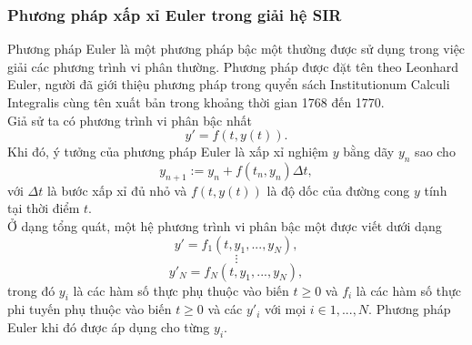 \documentclass[a4paper]{article}
\begin{document}
\subsubsection{Phương pháp xấp xỉ Euler trong giải hệ SIR}
Phương pháp Euler là một phương pháp bậc một thường được sử dụng trong việc giải các phương trình vi phân thường. Phương pháp được đặt tên theo Leonhard Euler, người đã giới thiệu phương pháp trong quyển sách Institutionum Calculi Integralis cùng tên xuất bản trong khoảng thời gian 1768 đến 1770.
\\
Giả sử ta có phương trình vi phân bậc nhất
\begin{equation}
y' = f(t,y(t)).
\end{equation}
Khi đó, ý tưởng của phương pháp Euler là xấp xỉ nghiệm $y$ bằng dãy $y_n$ sao cho
\begin{equation}
y_{n+1} := y_n + f(t_n,y_n) \Delta t,
\end{equation}
với $\Delta t$ là bước xấp xỉ đủ nhỏ và $f(t,y(t))$ là độ dốc của đường cong $y$ tính tại thời điểm $t$. 
\\
\indent Ở dạng tổng quát, một hệ phương trình vi phân bậc một được viết dưới dạng
\begin{equation}
y' = f_1(t,y_1,...,y_N),
\end{equation}
 \[\vdots\]
\begin{equation}
y'_N = f_N(t,y_1,...,y_N),
\end{equation}
trong đó $y_i$ là các hàm số thực phụ thuộc vào biến $t \geq 0$ và $f_i$ là các hàm số thực phi tuyến phụ thuộc vào biến $t \geq 0$ và các $y'_i$ với mọi $i \in {1, . . . , N}$. Phương pháp Euler khi đó được áp dụng cho từng $y_i$.
\end{document}

